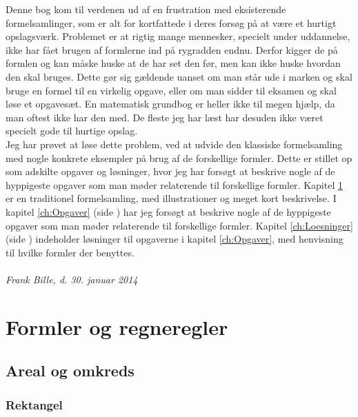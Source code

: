 \documentclass[11pt,a5paper,fleqn,leqno]{book}
\begin{document}
Denne bog kom til verdenen ud af en frustration med eksisterende formelsamlinger, som er alt for kortfattede i deres forsøg på at være et hurtigt opslagsværk. Problemet er at rigtig mange mennesker, specielt under uddannelse, ikke har fået brugen af formlerne ind på rygradden endnu. Derfor kigger de på formlen og kan måske huske at de har set den før, men kan ikke huske hvordan den skal bruges. Dette gør sig gældende uanset om man står ude i marken og skal bruge en formel til en virkelig opgave, eller om man sidder til eksamen og skal løse et opgavesæt. En matematisk grundbog er heller ikke til megen hjælp, da man oftest ikke har den med. De fleste jeg har læst har desuden ikke været specielt gode til hurtige opslag.\\
\newline
Jeg har prøvet at løse dette problem, ved at udvide den klassiske formelsamling med nogle konkrete eksempler på brug af de forskellige formler. Dette er stillet op som adskilte opgaver og løsninger, hvor jeg har forsøgt at beskrive nogle af de hyppigeste opgaver som man møder relaterende til forskellige formler. Kapitel \ref{ch:Formler} er en traditionel formelsamling, med illustrationer og meget kort beskrivelse. I kapitel \ref{ch:Opgaver} (side \pageref{ch:Opgaver}) har jeg forsøgt at beskrive nogle af de hyppigeste opgaver som man møder relaterende til forskellige formler. Kapitel \ref{ch:Loesninger} (side \pageref{ch:Loesninger}) indeholder løsninger til opgaverne i kapitel \ref{ch:Opgaver}, med henvisning til hvilke formler der benyttes.\\
\\
\textit{Frank Bille, d. 30. januar 2014}

\mainmatter

\pagestyle{headings}

\chapter{Formler og regneregler} \label{ch:Formler}

\newpage

\section{Areal og omkreds}

\subsection{Rektangel}
\end{document}
